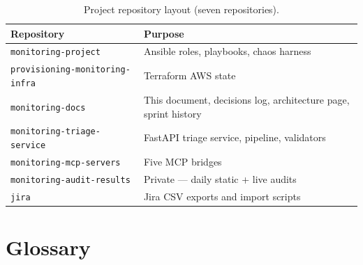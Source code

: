 \documentclass[11pt,a4paper,oneside]{report}
\begin{document}
\begin{table}[h]
\centering
\small
\begin{tabular}{ll}
\toprule
\textbf{Repository} & \textbf{Purpose} \\
\midrule
\texttt{monitoring-project}            & Ansible roles, playbooks,
                                         chaos harness \\
\texttt{provisioning-monitoring-infra} & Terraform AWS state \\
\texttt{monitoring-docs}               & This document, decisions
                                         log, architecture page,
                                         sprint history \\
\texttt{monitoring-triage-service}     & FastAPI triage service,
                                         pipeline, validators \\
\texttt{monitoring-mcp-servers}        & Five MCP bridges \\
\texttt{monitoring-audit-results}      & Private --- daily static +
                                         live audits \\
\texttt{jira}                          & Jira CSV exports and import
                                         scripts \\
\bottomrule
\end{tabular}
\caption{Project repository layout (seven repositories).}
\label{tab:repos}
\end{table}

\chapter{Glossary}
\label{app:glossary}
\end{document}
